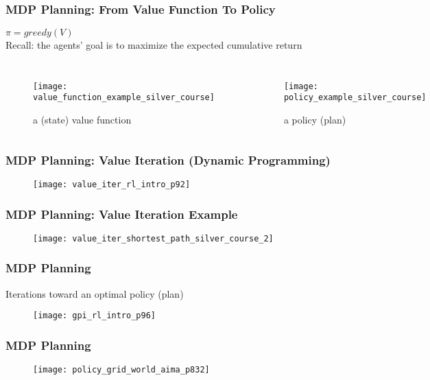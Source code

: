 \begin{frame}
\frametitle{MDP Planning: From Value Function To Policy}
$\pi = greedy(V)$ \\
Recall: the agents' goal is to maximize the expected cumulative return

\begin{columns}
    \begin{figure}
        \centering
        \texttt{[image: value\_function\_example\_silver\_course]}
        \caption{a (state) value function}
    \end{figure}

    \begin{figure}
        \centering
        \texttt{[image: policy\_example\_silver\_course]}
        \caption{a policy (plan)}
    \end{figure}
\end{columns}
\end{frame}

\begin{frame}
\frametitle{MDP Planning: Value Iteration (Dynamic Programming)}
\begin{figure}
    \centering
    \texttt{[image: value\_iter\_rl\_intro\_p92]}
\end{figure}
\end{frame}

\begin{frame}
\frametitle{MDP Planning: Value Iteration Example}
\begin{figure}
    \centering
    \texttt{[image: value\_iter\_shortest\_path\_silver\_course\_2]}
\end{figure}
\end{frame}

\begin{frame}
\frametitle{MDP Planning}
Iterations toward an optimal policy (plan)
\begin{figure}
    \centering
    \texttt{[image: gpi\_rl\_intro\_p96]}
\end{figure}
\end{frame}

\begin{frame}
\frametitle{MDP Planning}
\begin{figure}
    \centering
    \texttt{[image: policy\_grid\_world\_aima\_p832]}
\end{figure}
\end{frame}